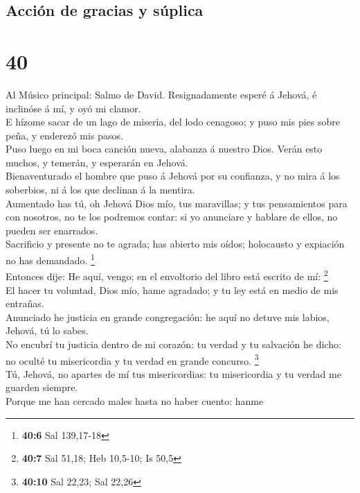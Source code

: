\hypertarget{acciuxf3n-de-gracias-y-suxfaplica}{%
\subsection{Acción de gracias y
súplica}\label{acciuxf3n-de-gracias-y-suxfaplica}}

\hypertarget{section-39}{%
\section{40}\label{section-39}}

 Al Músico principal: Salmo de David. Resignadamente esperé
á Jehová, é inclinóse á mí, y oyó mi clamor.\\
 E hízome sacar de un lago de miseria, del lodo cenagoso; y
puso mis pies sobre peña, y enderezó mis pasos.\\
 Puso luego en mi boca canción nueva, alabanza á nuestro
Dios. Verán esto muchos, y temerán, y esperarán en Jehová.\\
 Bienaventurado el hombre que puso á Jehová por su
confianza, y no mira á los soberbios, ni á los que declinan á la
mentira.\\
 Aumentado has tú, oh Jehová Dios mío, tus maravillas; y tus
pensamientos para con nosotros, no te los podremos contar: si yo
anunciare y hablare de ellos, no pueden ser enarrados.\\
 Sacrificio y presente no te agrada; has abierto mis oídos;
holocausto y expiación no has demandado. \footnote{\textbf{40:6} Sal
  139,17-18}\\
 Entonces dije: He aquí, vengo; en el envoltorio del libro
está escrito de mí: \footnote{\textbf{40:7} Sal 51,18; Heb 10,5-10; Is
  50,5}\\
 El hacer tu voluntad, Dios mío, hame agradado; y tu ley
está en medio de mis entrañas.\\
 Anunciado he justicia en grande congregación: he aquí no
detuve mis labios, Jehová, tú lo sabes.\\
 No encubrí tu justicia dentro de mi corazón: tu verdad y
tu salvación he dicho: no oculté tu misericordia y tu verdad en grande
concurso. \footnote{\textbf{40:10} Sal 22,23; Sal 22,26}\\
 Tú, Jehová, no apartes de mí tus misericordias: tu
misericordia y tu verdad me guarden siempre.\\
 Porque me han cercado males hasta no haber cuento: hanme
